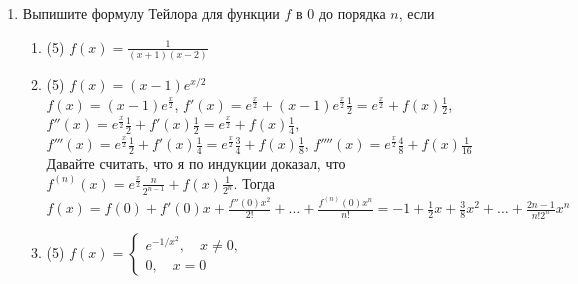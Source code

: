 \documentclass[a4paper]{article}
\begin{document}
\begin{enumerate}
\begin{enumerate}
    \end{enumerate}
    
    \item Выпишите формулу Тейлора для функции $f$ в $0$ до порядка $n$, если
    \begin{enumerate}
        \item (5) $f(x) = \frac{1}{(x+1)(x-2)}$
        \item (5) $f(x) = (x-1)e^{x/2}$\\
        $f(x) = (x-1)e^{\frac{x}{2}}$, $f'(x) = e^{\frac{x}{2}} + (x-1)e^{\frac{x}{2}}\frac{1}{2} = e^\frac{x}{2} + f(x)\frac{1}{2}$, $f''(x) = e^\frac{x}{2}\frac{1}{2} + f'(x)\frac{1}{2} = e^\frac{x}{2} + f(x)\frac{1}{4}$,\\
        $f'''(x) = e^\frac{x}{2}\frac{1}{2} + f'(x)\frac{1}{4} = e^\frac{x}{2}\frac{3}{4} + f(x)\frac{1}{8}$, $f''''(x) = e^\frac{x}{2}\frac{4}{8} + f(x)\frac{1}{16}$\\
        Давайте считать, что я по индукции доказал, что $f^{(n)}(x) = e^\frac{x}{2}\frac{n}{2^{{n-1}}} + f(x)\frac{1}{2^n}$.
        Тогда $f(x) = f(0) + f'(0)x + \frac{f''(0)x^2}{2!} + \ldots + \frac{f^{(n)}(0)x^n}{n!} = -1 + \frac{1}{2}x + \frac{3}{8}x^2 + \ldots + \frac{2n - 1}{n!2^n}x^n$
        \item (5) $f(x) = \begin{cases}e^{-1/x^2},\quad x\neq 0,\\ 0,\quad x=0\end{cases}$
    \end{enumerate}
    

\end{enumerate}
\end{document}
